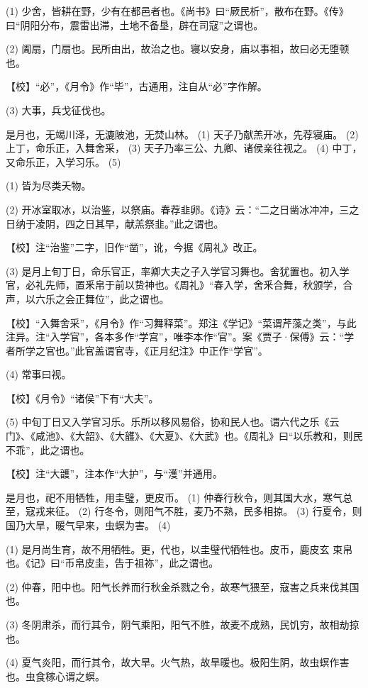 \documentclass[12pt,UTF8]{ctexbook}
\begin{document}
(1) 少舍，皆耕在野，少有在都邑者也。《尚书》曰“厥民析”，散布在野。《传》曰“阴阳分布，震雷出滞，土地不备垦，辟在司寇”之谓也。

(2) 阖扇，门扇也。民所由出，故治之也。寝以安身，庙以事祖，故曰必无堕顿也。

【校】“必”，《月令》作“毕”，古通用，注自从“必”字作解。

(3) 大事，兵戈征伐也。

是月也，无竭川泽，无漉陂池，无焚山林。 (1) 天子乃献羔开冰，先荐寝庙。 (2) 上丁，命乐正，入舞舍采， (3) 天子乃率三公、九卿、诸侯亲往视之。 (4) 中丁，又命乐正，入学习乐。 (5)

(1) 皆为尽类夭物。

(2) 开冰室取冰，以治鉴，以祭庙。春荐韭卵。《诗》云：“二之日凿冰冲冲，三之日纳于凌阴，四之日其早，献羔祭韭。”此之谓也。

【校】注“治鉴”二字，旧作“凿”，讹，今据《周礼》改正。

(3) 是月上旬丁日，命乐官正，率卿大夫之子入学官习舞也。舍犹置也。初入学官，必礼先师，置釆帛于前以贽神也。《周礼》“春入学，舍釆合舞，秋颁学，合声，以六乐之会正舞位”，此之谓也。

【校】“入舞舍采”，《月令》作“习舞释菜”。郑注《学记》“菜谓芹藻之类”，与此注异。注“入学官”，各本多作“学宫”，唯李本作“官”。案《贾子·保傅》云：“学者所学之官也。”此官盖谓官寺，《正月纪注》中正作“学官”。

(4) 常事曰视。

【校】《月令》“诸侯”下有“大夫”。

(5) 中旬丁日又入学官习乐。乐所以移风易俗，协和民人也。谓六代之乐《云门》、《咸池》、《大韶》、《大頀》、《大夏》、《大武》也。《周礼》曰“以乐教和，则民不乖”，此之谓也。

【校】注“大頀”，注本作“大护”，与“濩”并通用。

是月也，祀不用牺牲，用圭璧，更皮币。 (1) 仲春行秋令，则其国大水，寒气总至，寇戎来征。 (2) 行冬令，则阳气不胜，麦乃不熟，民多相掠。 (3) 行夏令，则国乃大旱，暖气早来，虫螟为害。 (4)

(1) 是月尚生育，故不用牺牲。更，代也，以圭璧代牺牲也。皮币，鹿皮玄 束帛也。《记》曰“币帛皮圭，告于祖祢”，此之谓也。

(2) 仲春，阳中也。阳气长养而行秋金杀戮之令，故寒气猥至，寇害之兵来伐其国也。

(3) 冬阴肃杀，而行其令，阴气乘阳，阳气不胜，故麦不成熟，民饥穷，故相劫掠也。

(4) 夏气炎阳，而行其令，故大旱。火气热，故旱暖也。极阳生阴，故虫螟作害也。虫食稼心谓之螟。
\end{document}

